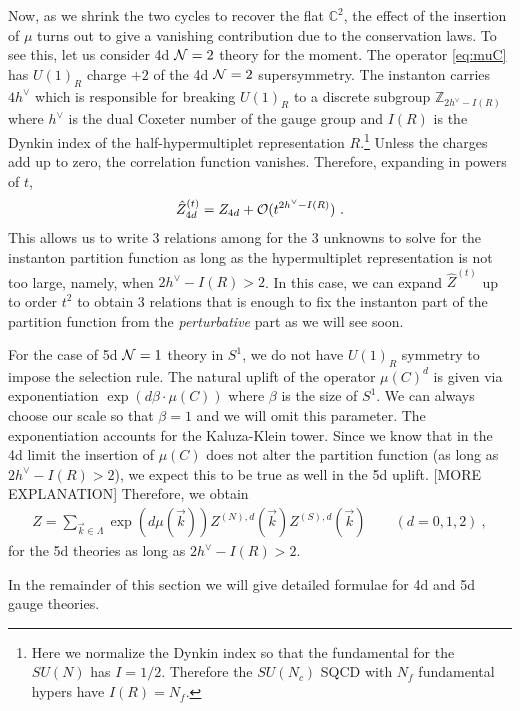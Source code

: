 \documentclass[letterpaper, 11pt]{article}
\def\IC{\mathbb{C}}
\def\IZ{\mathbb{Z}}
\def\CN{{\cal N}}
\def\CO{{\cal O}}
\begin{document}
Now, as we shrink the two cycles to recover the flat $\IC^2$, the effect of the insertion of $\mu$ turns out to give a vanishing contribution due to the conservation laws. 
To see this, let us consider 4d $\CN=2$ theory for the moment. The operator \eqref{eq:muC} has $U(1)_R$ charge $+2$ of the 4d $\CN=2$ supersymmetry. The instanton carries $4h^\vee$ which is responsible for breaking $U(1)_R$ to a discrete subgroup $\IZ_{2h^\vee - I(R)}$ where $h^\vee$ is the dual Coxeter number of the gauge group and $I(R)$ is the Dynkin index of the half-hypermultiplet representation $R$.\footnote{Here we normalize the Dynkin index so that the fundamental for the $SU(N)$ has $I=1/2$. Therefore the $SU(N_c)$ SQCD with $N_f$ fundamental hypers have $I(R) = N_f$.} Unless the charges add up to zero, the correlation function vanishes. Therefore, expanding in powers of $t$, 
\begin{align}
\hat{Z}_{4d}^{(t)} = Z_{4d} + \CO(t^{2h^\vee - I(R)})  \ . 
\end{align}
This allows us to write 3 relations among for the 3 unknowns to solve for the instanton partition function as long as the hypermultiplet representation is not too large, namely, when $2h^\vee - I(R) > 2$. In this case, we can expand $\hat{Z}^{(t)}$ up to order $t^2$ to obtain 3 relations that is enough to fix the instanton part of the partition function from the \emph{perturbative} part as we will see soon. 

For the case of 5d $\CN=1$ theory in $S^1$, we do not have $U(1)_R$ symmetry to impose the selection rule. The natural uplift of the operator $\mu(C)^d$ is given via exponentiation $\exp\left( d \beta \cdot \mu (C) \right)$ where $\beta$ is the size of $S^1$. We can always choose our scale so that $\beta = 1$ and we will omit this parameter. The exponentiation accounts for the Kaluza-Klein tower. Since we know that in the 4d limit the insertion of $\mu(C)$ does not alter the partition function (as long as $2h^\vee - I(R)>2$), we expect this to be true as well in the 5d uplift. 
[MORE EXPLANATION] 
Therefore, we obtain
\begin{align}
 Z = \sum_{\vec{k} \in \Lambda} \exp\left( d \mu(\vec{k}) \right) Z^{(N), d}(\vec{k})  Z^{(S), d}(\vec{k})  \qquad (d=0, 1, 2) \ , 
\end{align} 
for the 5d theories as long as $2h^\vee - I(R) > 2$.

In the remainder of this section we will give detailed formulae for 4d and 5d gauge theories. 
\end{document}
